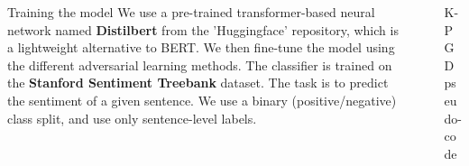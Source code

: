 \documentclass[final]{beamer}
\newlength{\sepwid}
\newlength{\onecolwid}
\newlength{\twocolwid}
\begin{document}
\begin{frame}
\begin{columns}[t]
\begin{column}{\onecolwid}
\begin{exampleblock}{Training the model}
We use a pre-trained transformer-based neural network named \textbf{Distilbert}\cite{sanh2019distilbert} from the 'Huggingface'\cite{Wolf2019HuggingFacesTS} repository, which is a lightweight alternative to BERT. We then fine-tune the model using the different adversarial learning methods. 
The classifier is trained on the  \textbf{Stanford Sentiment Treebank}\cite{SST2} dataset.  The task is to predict the sentiment of a given sentence. We use a binary (positive/negative) class split, and use only sentence-level labels.
\end{exampleblock}

\end{column} %

\begin{column}{\sepwid}\end{column} %

\begin{column}{\twocolwid} %

\begin{columns}[t,totalwidth=\twocolwid] %

\begin{column}{\onecolwid}\vspace{-.74in} %









\begin{exampleblock}{K-PGD pseudo-code}
\vspace{.65em}
\begin{algorithm}[H]


\end{algorithm}
\end{exampleblock}
\end{column}
\end{columns}
\end{column}
\end{columns}
\end{frame}
\end{document}
